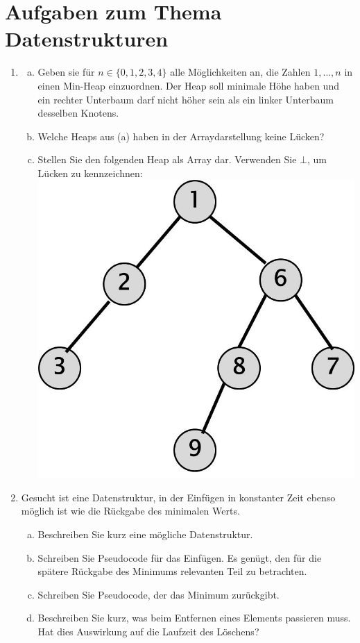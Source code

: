 \documentclass{scrartcl}
\begin{document}
\section*{Aufgaben zum Thema Datenstrukturen}
\begin{enumerate}[(1)]

\item
\begin{enumerate}[(a)]
\item Geben sie f\"ur $n\in \{0,1,2,3,4\}$ alle M\"oglichkeiten an, die Zahlen $1,\dots,n$ in einen Min-Heap einzuordnen. Der Heap soll minimale H\"ohe haben und ein rechter Unterbaum darf nicht h\"oher sein als ein linker Unterbaum desselben Knotens.
\item Welche Heaps aus (a) haben in der Arraydarstellung keine L\"ucken?
\item Stellen Sie den folgenden Heap als Array dar. Verwenden Sie $\bot$, um L\"ucken zu kennzeichnen:\newline
{\center\includegraphics[scale=0.3]{images/Heap.jpg}}
\end{enumerate}

\item
Gesucht ist eine Datenstruktur, in der Einf\"ugen in konstanter Zeit ebenso m\"oglich ist wie die R\"uckgabe des minimalen Werts.
\begin{enumerate}[(a)]
\item Beschreiben Sie kurz eine m\"ogliche Datenstruktur.
\item Schreiben Sie Pseudocode f\"ur das Einf\"ugen. Es gen\"ugt, den f\"ur die sp\"atere R\"uckgabe des Minimums relevanten Teil zu betrachten.
\item Schreiben Sie Pseudocode, der das Minimum zur\"uckgibt.
\item Beschreiben Sie kurz, was beim Entfernen eines Elements passieren muss. Hat dies Auswirkung auf die Laufzeit des L\"oschens?
\end{enumerate}


\end{enumerate}
\end{document}
